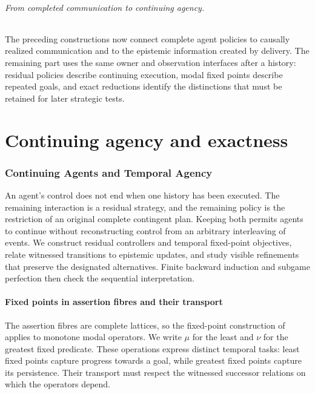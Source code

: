 \documentclass[11pt,a4paper]{article}
\numberwithin{equation}{section}
\theoremstyle{definition}
\theoremstyle{remark}
\theoremstyle{plain}
\begin{document}
\paragraph{From completed communication to continuing agency.}
The preceding constructions now connect complete agent policies to
causally realized communication and to the epistemic information created
by delivery. The remaining part uses the same owner and observation
interfaces after a history: residual policies describe continuing
execution, modal fixed points describe repeated goals, and exact
reductions identify the distinctions that must be retained for later
strategic tests.

\part{Continuing agency and exactness}

\section{Continuing Agents and Temporal Agency}\label{sec:paper-12}

An agent's control does not end when one history has been executed.
The remaining interaction is a residual strategy, and the remaining
policy is the restriction of an original complete contingent plan.
Keeping both permits agents to continue without reconstructing
control from an arbitrary interleaving of events. We construct
residual controllers and temporal fixed-point objectives, relate
witnessed transitions to epistemic updates, and study visible
refinements that preserve the designated alternatives. Finite
backward induction and subgame perfection then check the sequential
interpretation.

\subsection{Fixed points in assertion fibres and their transport}

The assertion fibres are complete lattices, so the fixed-point
construction of \citet{Tarski1955} applies to monotone modal
operators. We write $\mu$ for the least and $\nu$ for the greatest
fixed predicate. These operations express distinct temporal tasks:
least fixed points capture progress towards a goal, while greatest
fixed points capture its persistence. Their transport must respect
the witnessed successor relations on which the operators depend.
\end{document}
